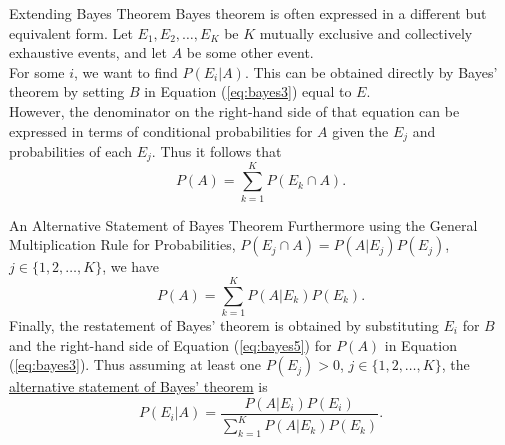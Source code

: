 \documentclass[pdf]{beamer}
\theoremstyle{remark}
\theoremstyle{definition}
\begin{document}
\begin{frame}[t]{Extending Bayes Theorem}
Bayes theorem is often expressed in a different but equivalent form.  Let $E_1, E_2, \ldots, E_K$ be $K$ mutually exclusive and collectively exhaustive events, and let $A$ be some other event.  \\
\vspace{1.5ex}
For some $i$, we want to find $P(E_i|A)$.  This can be obtained directly by Bayes' theorem by setting $B$ in Equation (\ref{eq:bayes3}) equal to $E$.  \\
\vspace{1.5ex}
However, the denominator on the right-hand side of that equation can be expressed in terms of conditional probabilities for $A$ given the $E_j$ and probabilities of each $E_j$.  Thus it follows that 
\begin{equation} \label{eq:bayes4}
P(A) = \sum_{k=1}^{K} P(E_k \cap A).
\end{equation}
\end{frame}

\begin{frame}[t]{An Alternative Statement of Bayes Theorem}
Furthermore using the General Multiplication Rule for Probabilities, $P(E_j \cap A) = P(A|E_j)P(E_j)$, $j \in \{1,2,\ldots,K\}$, we have \\
\vspace{-0.5ex}
\begin{equation} \label{eq:bayes5}
P(A) = \sum_{k=1}^{K} P(A|E_k)P(E_k).
\end{equation}
Finally, the restatement of Bayes' theorem is obtained by substituting $E_i$ for $B$ and the right-hand side of Equation (\ref{eq:bayes5}) for $P(A)$ in Equation (\ref{eq:bayes3}).  Thus assuming at least one $P(E_j)>0$, $j \in \{1,2,\ldots, K\}$, the \underline{alternative statement of Bayes' theorem} is \\
\vspace{-0.5ex}
\begin{equation} \label{eq:bayes6}
P(E_i |A ) = \frac{P(A|E_i)P(E_i)}{\sum_{k=1}^{K} P(A|E_k)P(E_k)}.
\end{equation}  
\end{frame}
\end{document}
